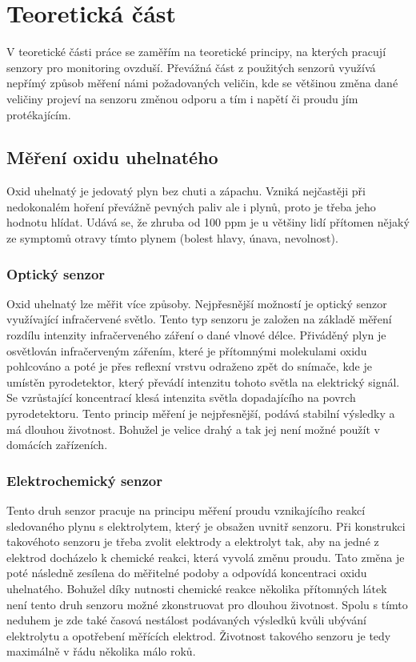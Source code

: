 \chapter{Teoretická část}

V teoretické části práce se zaměřím na teoretické principy, na kterých pracují senzory pro monitoring ovzduší. Převážná část z použitých senzorů využívá nepřímý způsob měření námi požadovaných veličin, kde se většinou změna dané veličiny projeví na senzoru změnou odporu a tím i napětí či proudu jím protékajícím.

\section{Měření oxidu uhelnatého}

Oxid uhelnatý je jedovatý plyn bez chuti a zápachu. Vzniká nejčastěji při nedokonalém hoření převážně pevných paliv ale i plynů, proto je třeba jeho hodnotu hlídat. Udává se, že zhruba od 100 ppm je u většiny lidí přítomen nějaký ze symptomů otravy tímto plynem (bolest hlavy, únava, nevolnost).

\subsection{Optický senzor}

Oxid uhelnatý lze měřit více způsoby. Nejpřesnější možností je optický senzor využívající infračervené světlo. Tento typ senzoru je založen na základě měření rozdílu intenzity infračerveného záření o dané vlnové délce. Přiváděný plyn je osvětlován infračerveným zářením, které je přítomnými molekulami oxidu pohlcováno a poté je přes reflexní vrstvu odraženo zpět do snímače, kde je umístěn pyrodetektor, který převádí intenzitu tohoto světla na elektrický signál. Se vzrůstající koncentrací klesá intenzita světla dopadajícího na povrch pyrodetektoru. Tento princip měření je nejpřesnější, podává stabilní výsledky a má dlouhou životnost. Bohužel je velice drahý a tak jej není možné použít v domácích zařízeních.

\subsection{Elektrochemický senzor}

Tento druh senzor pracuje na principu měření proudu vznikajícího reakcí sledovaného plynu s elektrolytem, který je obsažen uvnitř senzoru. Při konstrukci takovéhoto senzoru je třeba zvolit elektrody a elektrolyt tak, aby na jedné z elektrod docházelo k chemické reakci, která vyvolá změnu proudu. Tato změna je poté následně zesílena do měřitelné podoby a odpovídá koncentraci oxidu uhelnatého. Bohužel díky nutnosti chemické reakce několika přítomných látek není tento druh senzoru možné zkonstruovat pro dlouhou životnost. Spolu s tímto neduhem je zde také časová nestálost podávaných výsledků kvůli ubývání elektrolytu a opotřebení měřících elektrod. Životnost takového senzoru je tedy maximálně v řádu několika málo roků. 

